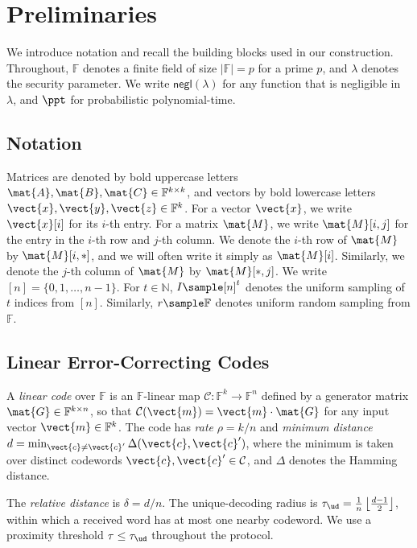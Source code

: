 \section{Preliminaries}
\label{sec:prelim}

We introduce notation and recall the building blocks used in our construction.
Throughout, $\mathbb{F}$ denotes a finite field of size $|\mathbb{F}| = p$ for a prime $p$, and $\lambda$ denotes the security parameter.
We write $\textsf{negl}(\lambda)$ for any function that is negligible in~$\lambda$, and $\ppt$ for probabilistic polynomial-time.

\subsection{Notation}
\label{sec:notation}

Matrices are denoted by bold uppercase letters $\mat{A}, \mat{B}, \mat{C} \in \mathbb{F}^{k \times k}$, and vectors by bold lowercase letters $\vect{x}, \vect{y}, \vect{z} \in \mathbb{F}^k$.
For a vector $\vect{x}$, we write $\vect{x}[i]$ for its $i$-th entry. For a
matrix $\mat{M}$, we write $\mat{M}[i,j]$ for the entry in the $i$-th row and $j$-th column. 
We denote the $i$-th row of $\mat{M}$ by $\mat{M}[i,*]$, and we will often write it simply as $\mat{M}[i]$. 
Similarly, we denote the $j$-th column of $\mat{M}$ by $\mat{M}[*,j]$. We write $[n] = \{0,1,\ldots,n-1\}$. For $t \in \mathbb{N}$, $I \sample [n]^t$ denotes the uniform sampling of $t$ indices from $[n]$. Similarly, $r \sample \mathbb{F}$ denotes uniform random sampling from
$\mathbb{F}$.



\subsection{Linear Error-Correcting Codes}
\label{sec:prelim-codes}

A \emph{linear code} over $\mathbb{F}$ is an $\mathbb{F}$-linear map
$\mathcal{C}: \mathbb{F}^k \to \mathbb{F}^n$ defined by a generator matrix
$\mat{G} \in \mathbb{F}^{k \times n}$, so that
$\mathcal{C}(\vect{m}) = \vect{m} \cdot \mat{G}$ for any input vector
$\vect{m} \in \mathbb{F}^k$.
The code has \emph{rate} $\rho = k/n$ and \emph{minimum distance} $d = \min_{\vect{c} \neq \vect{c}'} \Delta(\vect{c}, \vect{c}')$,
where the minimum is taken over distinct codewords
$\vect{c}, \vect{c}' \in \mathcal{C}$, and $\Delta$ denotes the Hamming distance.
\begin{revblock}
  The \emph{relative distance} is $\delta = d/n$. The unique-decoding radius is \(\tau_\ud=\frac{1}{n}\left\lfloor\frac{d-1}{2}\right\rfloor\), within which a received word has at most one nearby codeword. We use a proximity threshold \(\tau \leq \tau_\ud\) throughout the protocol.
\end{revblock}


